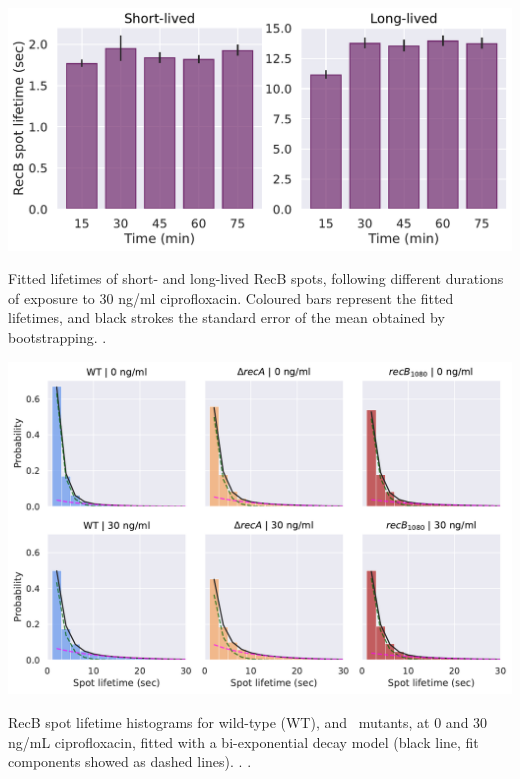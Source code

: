 \begin{suppfigure*}[htbp]
    \begin{center}
    \includegraphics[width=.7\linewidth]{SI_Figures/RecB_lifetime_timepoints.pdf}
    \end{center}
    \caption{Fitted lifetimes of short- and long-lived RecB spots, following different durations of exposure to 30 ng/ml ciprofloxacin. Coloured bars represent the fitted lifetimes, and black strokes the standard error of the mean obtained by bootstrapping. . }
    \label{SIFig:RecB_lifetimes_timepoints}
    \end{suppfigure*}

\begin{suppfigure*}[htbp]
    \begin{center}
    \includegraphics[width=.8\textwidth]{SI_Figures/Mutants_RecB_fits.pdf}
    \end{center}
    \caption{RecB spot lifetime histograms for wild-type (WT), \dreca and \geneteneighty\ mutants, at 0 and 30 ng/mL ciprofloxacin, fitted with a bi-exponential decay model (black line, fit components showed as dashed lines). . .}
    \label{SIFig:mutants_biexp_fits}
\end{suppfigure*}

